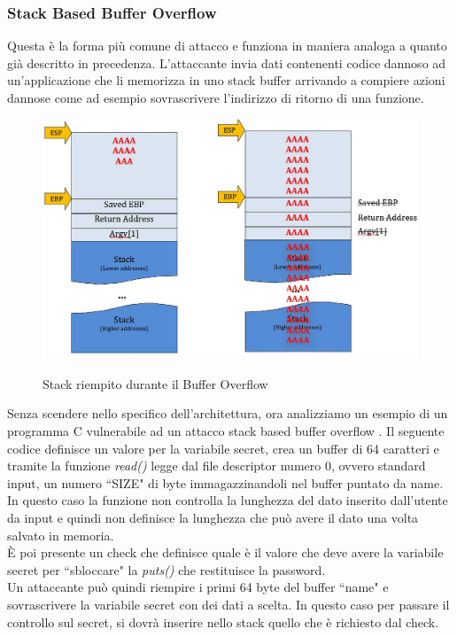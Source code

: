\subsubsection*{Stack Based Buffer Overflow}

Questa è la forma più comune di attacco e funziona in maniera analoga a quanto già descritto in precedenza. L'attaccante invia dati contenenti codice dannoso ad un’applicazione che li memorizza in uno stack buffer arrivando a compiere azioni dannose come ad esempio sovrascrivere l'indirizzo di ritorno di una funzione.

\vspace{1cm}
\FloatBarrier
\begin{figure}[!htbp]
    \centering
    \includegraphics[width=0.7\linewidth]{images/buffer-overflow-example.png}
    \caption{Stack riempito durante il Buffer Overflow} \cite{Medium}
\end{figure}
\FloatBarrier

Senza scendere nello specifico dell'architettura, ora analizziamo un esempio di un programma C vulnerabile ad un attacco stack based buffer overflow \cite{CTF101}. Il seguente codice definisce un valore per la variabile secret, crea un buffer di 64 caratteri e tramite la funzione \textit{read()} legge dal file descriptor numero 0, ovvero standard input, un numero  ``SIZE" di byte immagazzinandoli nel buffer puntato da name.
In questo caso la funzione non controlla la lunghezza del dato inserito dall'utente da input e quindi non definisce la lunghezza che può avere il dato una volta salvato in memoria. \\
È poi presente un check che definisce quale è il valore che deve avere la variabile secret per ``sbloccare" la \textit{puts()} che restituisce la password.  \\
Un attaccante può quindi riempire i primi 64 byte del buffer ``name" e sovrascrivere la variabile secret con dei dati a scelta. In questo caso per passare il controllo sul secret, si dovrà inserire nello stack quello che è richiesto dal check. 

